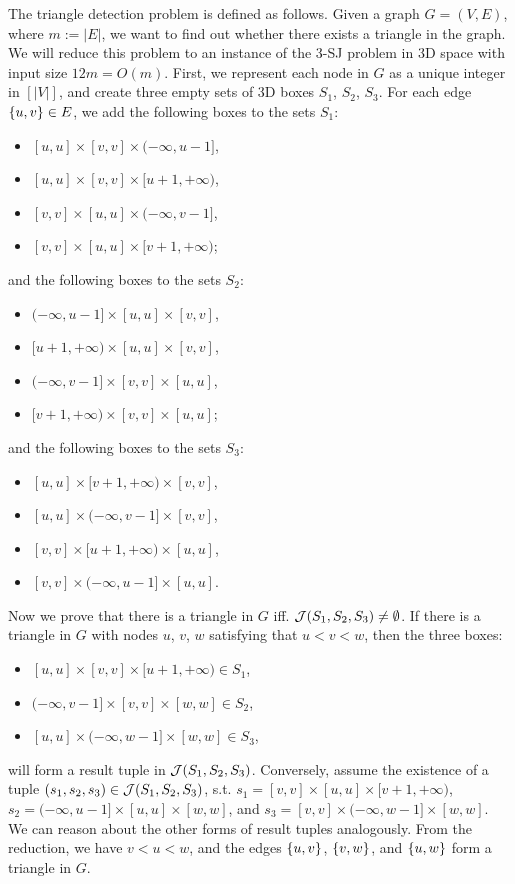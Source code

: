 The triangle detection problem is defined as follows. Given a graph $G = (V,E)$, where $m:=|E|$, we want to find out whether there exists a triangle in the graph. We will reduce this problem to an instance of the 3-SJ problem in 3D space with input size $12m=O(m)$. First, we represent each node in $G$ as a unique integer in $[|V|]$, and create three empty sets of 3D boxes $S_1$, $S_2$, $S_3$. For each edge $\{u,v\}\in E$, we add the following boxes to the sets $S_1$:
\begin{itemize}
    \item $[u,u]\times [v,v]\times(-\infty,u-1]$,
    \item $[u,u]\times [v,v]\times[u+1,+\infty)$,
    \item $[v,v]\times [u,u] \times (-\infty,v-1]$,
    \item $[v,v]\times [u,u] \times [v+1,+\infty)$;
\end{itemize}
and the following boxes to the sets $S_2$:
\begin{itemize}
    \item $(-\infty,u-1]\times[u,u]\times [v,v]$,
    \item $[u+1,+\infty)\times[u,u]\times [v,v]$,
    \item $(-\infty,v-1] \times[v,v]\times [u,u]$,
    \item $ [v+1,+\infty)\times [v,v]\times [u,u]$;
\end{itemize}
and the following boxes to the sets $S_3$:
\begin{itemize}
    \item $[u,u]\times[v+1,+\infty)\times [v,v]$,
    \item $[u,u]\times(-\infty,v-1]\times [v,v]$,
    \item $[v,v]\times[u+1,+\infty)\times [u,u]$,
    \item $[v,v]\times(-\infty,u-1]\times [u,u]$.
\end{itemize}
Now we prove that there is a triangle in $G$ iff.
 $\mathcal{J}(S_1,S_2,S_3) \neq \emptyset$. If there is a triangle in $G$ with nodes $u$, $v$, $w$ satisfying that $u < v < w$, then the three boxes:
\begin{itemize}
    \item $[u,u]\times [v,v]\times[u+1, +\infty)\in S_1$,
    \item $(-\infty,v-1]\times[v,v]\times [w,w] \in S_2$,
    \item $[u,u]\times(-\infty, w-1]\times [w,w] \in S_3$,
\end{itemize}
will form a result tuple in $\mathcal{J}(S_1,S_2,S_3)$. Conversely, assume the existence of a tuple $(s_1,s_2,s_3)\in \mathcal{J}(S_1,S_2,S_3)$, s.t. $s_1 = [v,v]\times [u,u]\times[v+1, +\infty)$, $s_2 = (-\infty,u-1]\times[u,u]\times [w,w]$, and $s_3 = [v,v]\times(-\infty, w-1]\times [w,w]$. We can reason about the other forms of result tuples analogously. From the reduction, we have $v< u< w$, and the edges $\{u,v\}$, $\{v,w\}$, and $\{u,w\}$ form a triangle in $G$. 
